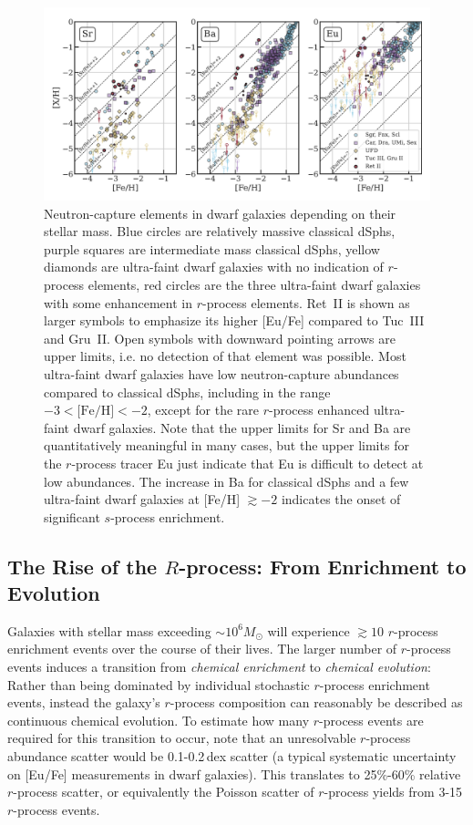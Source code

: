 \documentclass[letterpaper]{article}
\begin{document}
\begin{figure}
\centering
    \includegraphics[width=\linewidth]{figures/ufd_ncap2.pdf}
    \caption{Neutron-capture elements in dwarf galaxies depending on their stellar mass.
    Blue circles are relatively massive classical dSphs, purple squares are intermediate mass classical dSphs, yellow diamonds are ultra-faint dwarf galaxies with no indication of $r$-process elements, red circles are the three ultra-faint dwarf galaxies with some enhancement in $r$-process elements.
    Ret~II is shown as larger symbols to emphasize its higher [Eu/Fe] compared to Tuc~III and Gru~II.
    Open symbols with downward pointing arrows are upper limits, i.e. no detection of that element was possible.
    Most ultra-faint dwarf galaxies have low neutron-capture abundances compared to classical dSphs, including in the range $-3 < \mbox{[Fe/H]} < -2$, except for the rare $r$-process enhanced ultra-faint dwarf galaxies.
    Note that the upper limits for Sr and Ba are quantitatively meaningful in many cases, but the upper limits for the $r$-process tracer Eu just indicate that Eu is difficult to detect at low abundances.
    The increase in Ba for classical dSphs and a few ultra-faint dwarf galaxies at [Fe/H] $\gtrsim -2$ indicates the onset of significant $s$-process enrichment.
    \label{fig:ufdncap}}
\end{figure}



\subsection{The Rise of the $R$-process: From Enrichment to Evolution}\label{sec:cldw}

Galaxies with stellar mass exceeding ${\sim}10^6 M_\odot$ will experience $\gtrsim 10$ $r$-process enrichment events over the course of their lives.
The larger number of $r$-process events induces a transition from \emph{chemical enrichment} to \emph{chemical evolution}: Rather than being dominated by individual stochastic $r$-process enrichment events, instead the galaxy's $r$-process composition can reasonably be described as continuous chemical evolution.
To estimate how many $r$-process events are required for this transition to occur, note that an unresolvable $r$-process abundance scatter would be 0.1-0.2\,dex scatter (a typical systematic uncertainty on [Eu/Fe] measurements in dwarf galaxies). This translates to 25\%-60\% relative $r$-process scatter, or equivalently the Poisson scatter of $r$-process yields from 3-15 $r$-process events.
\end{document}
